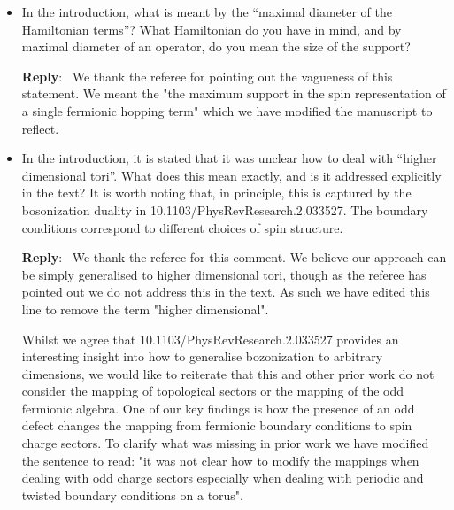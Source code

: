 \documentclass[aps,prx,floatfix,10pt,amssymb,amsfont,amsmath,superscriptaddress,float,nofootinbib,longbibliography,nobalancelastpage]{revtex4-2}
\newenvironment{reply}
   {\medskip \noindent \begin{sf}\textbf{Reply}:\ \color{blue}  }
   {\medskip \end{sf}}
\begin{document}
\begin{itemize}
\begin{reply}
    We do mean that local fermion parity even operators are mapped to local spin operators. We have clarified this by slightly modifying the only reference to our mapping being local in the main body of text to: "This mapping will be local in the sense that even fermionic hopping terms acting along edges of the graph $G$ will map to spin operators with a maximum Pauli weight $2\Delta-1$ (where $\Delta$ is the maximum degree of $G$)."
\end{reply}

\item In the introduction, what is meant by the “maximal diameter of the Hamiltonian terms”? What Hamiltonian do you have in mind, and by maximal diameter of an operator, do you mean the size of the support?

\begin{reply}
    We thank the referee for pointing out the vagueness of this statement. We meant the "the maximum support in the spin representation of a single fermionic hopping term" which we have modified the manuscript to reflect.
\end{reply}

\item In the introduction, it is stated that it was unclear how to deal with “higher dimensional tori”. What does this mean exactly, and is it addressed explicitly in the text? It is worth noting that, in principle, this is captured by the bosonization duality in 10.1103/PhysRevResearch.2.033527. The boundary conditions correspond to different choices of spin structure.

\begin{reply}
    We thank the referee for this comment. We believe our approach can be simply generalised to higher dimensional tori, though as the referee has pointed out we do not address this in the text. As such we have edited this line to remove the term "higher dimensional".

    Whilst we agree that 10.1103/PhysRevResearch.2.033527 provides an interesting insight into how to generalise bozonization to arbitrary dimensions, we would like to reiterate that this and other prior work do not consider the mapping of topological sectors or the mapping of the odd fermionic algebra. One of our key findings is how the presence of an odd defect changes the mapping from fermionic boundary conditions to spin charge sectors. To clarify what was missing in prior work we have modified the sentence to read: "it was not clear how to modify the mappings when dealing with odd charge sectors especially when dealing with periodic and twisted boundary conditions on a torus".
\end{reply}


\end{itemize}
\end{document}
